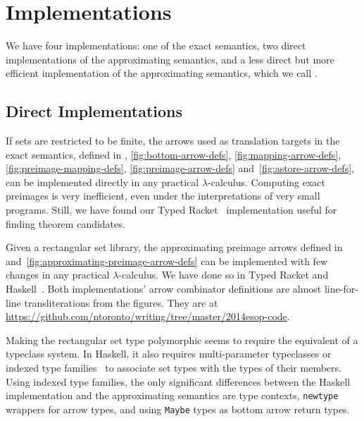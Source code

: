 
\section{Implementations}
\label{sec:implementation}

We have four implementations: one of the exact semantics, two direct implementations of the approximating semantics, and a less direct but more efficient implementation of the approximating semantics, which we call .

\subsection{Direct Implementations}

If sets are restricted to be finite, the arrows used as translation targets in the exact semantics, defined in , \ref{fig:bottom-arrow-defs}, \ref{fig:mapping-arrow-defs}, \ref{fig:preimage-mapping-defs}, \ref{fig:preimage-arrow-defs} and~\ref{fig:astore-arrow-defs}, can be implemented directly in any practical $\lambda$-calculus.
Computing exact preimages is very inefficient, even under the interpretations of very small programs.
Still, we have found our Typed Racket~\cite{cit:tobin-hochstadt-2008popl-typed-scheme} implementation useful for finding theorem candidates.

Given a rectangular set library, the approximating preimage arrows defined in  and~\ref{fig:approximating-preimage-arrow-defs} can be implemented with few changes in any practical $\lambda$-calculus.
We have done so in Typed Racket and Haskell~\cite{cit:haskell-lang}.
Both implementations' arrow combinator definitions are almost line-for-line transliterations from the figures.
They are at \url{https://github.com/ntoronto/writing/tree/master/2014esop-code}.

Making the rectangular set type polymorphic seems to require the equivalent of a typeclass system.
In Haskell, it also requires multi-parameter typeclasses or indexed type families~\cite{cit:chakravarty-2005popl-type-families} to associate set types with the types of their members.
Using indexed type families, the only significant differences between the Haskell implementation and the approximating semantics are type contexts, \texttt{newtype} wrappers for arrow types, and using \texttt{Maybe} types as bottom arrow return types.

